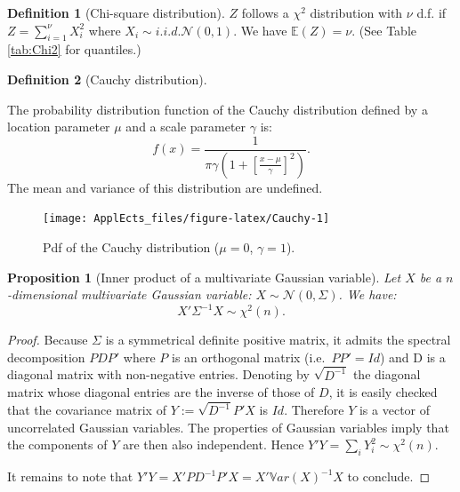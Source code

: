 \documentclass[
  12pt,
]{book}
\newtheorem{proposition}{Proposition}[chapter]
\theoremstyle{definition}
\newtheorem{definition}{Definition}[chapter]
\theoremstyle{definition}
\theoremstyle{definition}
\theoremstyle{definition}
\theoremstyle{remark}
\begin{document}
\begin{definition}[Chi-square distribution]
\protect\hypertarget{def:chi2}{}\label{def:chi2}\(Z\) follows a \(\chi^2\) distribution with \(\nu\) d.f. if \(Z = \sum_{i=1}^{\nu}X_i^2\) where \(X_i \sim i.i.d. \mathcal{N}(0,1)\).
We have \(\mathbb{E}(Z)=\nu\). (See Table \ref{tab:Chi2} for quantiles.)
\end{definition}

\begin{definition}[Cauchy distribution]
\protect\hypertarget{def:Cauchy}{}\label{def:Cauchy}

The probability distribution function of the Cauchy distribution defined by a location parameter \(\mu\) and a scale parameter \(\gamma\) is:
\[
f(x) = \frac{1}{\pi \gamma \left(1 + \left[\frac{x-\mu}{\gamma}\right]^2\right)}.
\]
The mean and variance of this distribution are undefined.

\begin{figure}
\texttt{[image: ApplEcts\_files/figure-latex/Cauchy-1]} \caption{Pdf of the Cauchy distribution ($\mu=0$, $\gamma=1$).}\label{fig:Cauchy}
\end{figure}

\end{definition}

\begin{proposition}[Inner product of a multivariate Gaussian variable]
\protect\hypertarget{prp:waldtypeproduct}{}\label{prp:waldtypeproduct}Let \(X\) be a \(n\)-dimensional multivariate Gaussian variable: \(X \sim \mathcal{N}(0,\Sigma)\). We have:
\[
X' \Sigma^{-1}X \sim \chi^2(n).
\]
\end{proposition}

\begin{proof}
Because \(\Sigma\) is a symmetrical definite positive matrix, it admits the spectral decomposition \(PDP'\) where \(P\) is an orthogonal matrix (i.e.~\(PP'=Id\)) and D is a diagonal matrix with non-negative entries. Denoting by \(\sqrt{D^{-1}}\) the diagonal matrix whose diagonal entries are the inverse of those of \(D\), it is easily checked that the covariance matrix of \(Y:=\sqrt{D^{-1}}P'X\) is \(Id\). Therefore \(Y\) is a vector of uncorrelated Gaussian variables. The properties of Gaussian variables imply that the components of \(Y\) are then also independent. Hence \(Y'Y=\sum_i Y_i^2 \sim \chi^2(n)\).

It remains to note that \(Y'Y=X'PD^{-1}P'X=X'\mathbb{V}ar(X)^{-1}X\) to conclude.
\end{proof}
\end{document}
